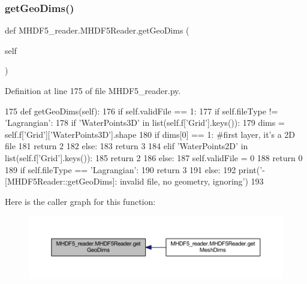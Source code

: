 \subsubsection{\texorpdfstring{get\+Geo\+Dims()}{getGeoDims()}}
{\footnotesize\ttfamily def M\+H\+D\+F5\+\_\+reader.\+M\+H\+D\+F5\+Reader.\+get\+Geo\+Dims (\begin{DoxyParamCaption}\item[{}]{self }\end{DoxyParamCaption})}



Definition at line 175 of file M\+H\+D\+F5\+\_\+reader.\+py.


\begin{DoxyCode}
175     \textcolor{keyword}{def }getGeoDims(self):
176         \textcolor{keywordflow}{if} self.validFile == 1:
177             \textcolor{keywordflow}{if} self.fileType != \textcolor{stringliteral}{'Lagrangian'}:
178                 \textcolor{keywordflow}{if} \textcolor{stringliteral}{'WaterPoints3D'} \textcolor{keywordflow}{in} list(self.f[\textcolor{stringliteral}{'Grid'}].keys()):
179                     dims = self.f[\textcolor{stringliteral}{'Grid'}][\textcolor{stringliteral}{'WaterPoints3D'}].shape
180                     \textcolor{keywordflow}{if} dims[0] == 1: \textcolor{comment}{#first layer, it's a 2D file}
181                         \textcolor{keywordflow}{return} 2
182                     \textcolor{keywordflow}{else}:
183                         \textcolor{keywordflow}{return} 3
184                 \textcolor{keywordflow}{elif} \textcolor{stringliteral}{'WaterPoints2D'} \textcolor{keywordflow}{in} list(self.f[\textcolor{stringliteral}{'Grid'}].keys()):
185                     \textcolor{keywordflow}{return} 2
186                 \textcolor{keywordflow}{else}: 
187                     self.validFile = 0
188                     \textcolor{keywordflow}{return} 0
189             \textcolor{keywordflow}{if} self.fileType == \textcolor{stringliteral}{'Lagrangian'}:
190                 \textcolor{keywordflow}{return} 3
191         \textcolor{keywordflow}{else}:
192             print(\textcolor{stringliteral}{'- [MHDF5Reader::getGeoDims]: invalid file, no geometry, ignoring'})
193             
\end{DoxyCode}
Here is the caller graph for this function\+:\nopagebreak
\begin{figure}[H]
\begin{center}
\leavevmode
\includegraphics[width=350pt]{class_m_h_d_f5__reader_1_1_m_h_d_f5_reader_aa433954c98bbb5384bbd25e523ca1925_icgraph}
\end{center}
\end{figure}
